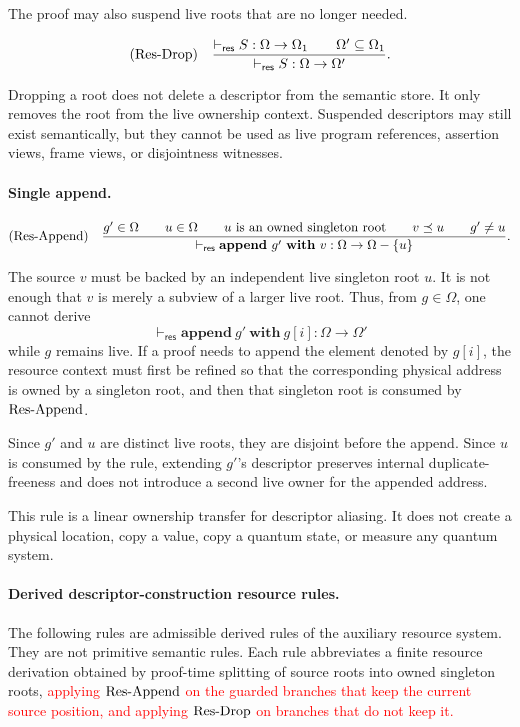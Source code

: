 \documentclass[acmsmall,screen,review,anonymous,nonacm]{acmart}
\theoremstyle{defn_style}
\begin{document}
The proof may also suspend live roots that are no longer needed.

\[
\text{\rm (Res-Drop)}
\quad
\frac{
\vdash_{\mathsf{res}}S:\Omega\rightarrow\Omega_1
\qquad
\Omega'\subseteq\Omega_1
}{
\vdash_{\mathsf{res}}S:\Omega\rightarrow\Omega'
}.
\]

Dropping a root does not delete a descriptor from the semantic store. It only
removes the root from the live ownership context. Suspended descriptors may
still exist semantically, but they cannot be used as live program references,
assertion views, frame views, or disjointness witnesses.

\paragraph{Single append.}

\[
\text{\rm (Res-Append)}
\quad
\frac{
g'\in\Omega
\qquad
u\in\Omega
\qquad
u\text{ is an owned singleton root}
\qquad
v\preceq u
\qquad
g'\ne u
}{
\vdash_{\mathsf{res}}
\mathbf{append}\ g'\ \mathbf{with}\ v
:\Omega\rightarrow
\Omega-\{u\}
}.
\]

The source \(v\) must be backed by an independent live singleton root \(u\).
It is not enough that \(v\) is merely a subview of a larger live root. Thus,
from \(g\in\Omega\), one cannot derive
\[
\vdash_{\mathsf{res}}
\mathbf{append}\ g'\ \mathbf{with}\ g[i]
:\Omega\rightarrow
\Omega'
\]
while \(g\) remains live. If a proof needs to append the element denoted by
\(g[i]\), the resource context must first be refined so that the corresponding
physical address is owned by a singleton root, and then that singleton root is
consumed by \({\rm Res\mbox{-}Append}\).

Since \(g'\) and \(u\) are distinct live roots, they are disjoint before the
append. Since \(u\) is consumed by the rule, extending \(g'\)'s descriptor
preserves internal duplicate-freeness and does not introduce a second live
owner for the appended address.

This rule is a linear ownership transfer for descriptor aliasing. It does not
create a physical location, copy a value, copy a quantum state, or measure any
quantum system.

\paragraph{Derived descriptor-construction resource rules.}

The following rules are admissible derived rules of the auxiliary resource
system. They are not primitive semantic rules. Each rule abbreviates a finite
resource derivation obtained by proof-time splitting of source roots into owned
singleton roots, 
\textcolor{red}{applying \({\rm Res\mbox{-}Append}\) on the guarded branches that keep the current source position, and applying \({\rm Res\mbox{-}Drop}\) on branches that do not keep it.}
\end{document}
